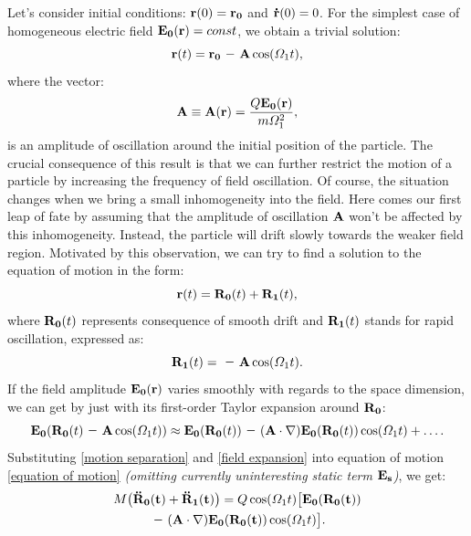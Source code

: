 Let's consider initial conditions: $\vb{r}(0) = \vb{r_0}$ and $\vb{\dot{r}}(0) = 0$. For the simplest case of homogeneous electric field $\vb{E_0}(\vb{r}) = const$, we obtain a trivial solution:
\begin{equation}
	\label{solution for homogenious field}
	\vb{r}(t) = \vb{r_0} \minus \vb{A} \cos(\Omega_1 t),
\end{equation}
where the vector: 
\begin{equation}
	\label{oscillation amplitude}
	\vb{A} \equiv \vb{A}(\vb{r}) = \frac{Q \vb{E_0}(\vb{r})}{m \Omega_1^2},
\end{equation}
is an amplitude of oscillation around the initial position of the particle. The crucial consequence of this result is that we can further restrict the motion of a particle by increasing the frequency of field oscillation. Of course, the situation changes when we bring a small inhomogeneity into the field. Here comes our first  leap of fate by assuming that the amplitude of oscillation $\vb{A}$ won't be affected by this inhomogeneity. Instead, the particle will drift slowly towards the weaker field region. Motivated by this observation, we can try to find a solution to the equation of motion in the form:
\begin{equation}
	\label{motion separation}
	\vb{r}(t) = \vb{R_0}(t) + \vb{R_1}(t),
\end{equation}
where $\vb{R_0}(t)$ represents consequence of smooth drift and $\vb{R_1}(t)$ stands for rapid oscillation, expressed as:
\begin{equation}
	\label{oscillation motion}
	\vb{R_1}(t) = \minus \vb{A} \cos(\Omega_1 t).
\end{equation}
If the field amplitude $\vb{E_0}(\vb{r})$ varies smoothly with regards to the space dimension, we can get by just with its first-order Taylor expansion around $\vb{R_0}$:
\begin{equation}
	\label{field expansion}
	\vb{E_0}(\vb{R_0}(t) \minus \vb{A} \cos(\Omega_1 t)) \approx \vb{E_0}(\vb{R_0}(t)) \minus(\vb{A} \cdot \nabla) \vb{E_0}(\vb{R_0}(t)) \cos(\Omega_1 t) + \dots.
\end{equation}
Substituting \eqref{motion separation} and \eqref{field expansion} into equation of motion \eqref{equation of motion} \textit{(omitting currently uninteresting static term $\vb{E_s}$)}, we get:
\begin{multline}
	M \big( \vb{\ddot{R}_0(t)} + \vb{\ddot{R}_1(t)} \big) = Q \cos(\Omega_1 t) \big[ \vb{E_0(\vb{R_0}(t))} \\ \minus (\vb{A} \cdot \nabla) \vb{E_0(\vb{R_0}(t))} \cos(\Omega_1 t)  \big].
\end{multline}
